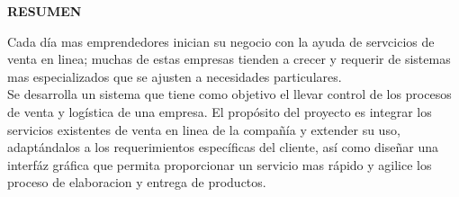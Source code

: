 
\begin{center}
  {\Large \bf{RESUMEN}}
\end{center}
Cada día mas emprendedores inician su negocio con la ayuda de servcicios de venta en linea; muchas de estas empresas 
tienden a crecer y requerir de sistemas mas especializados que se ajusten a necesidades particulares.\\[0.3cm]
Se desarrolla un sistema que tiene como objetivo el llevar control de los procesos de venta y logística de una empresa.
El propósito del proyecto es integrar los servicios existentes de venta en linea de la compañía
y extender su uso, adaptándalos a los requerimientos específicas del cliente, así como diseñar una interfáz gráfica que permita
proporcionar un servicio mas rápido y agilice los proceso de elaboracion y entrega de productos.